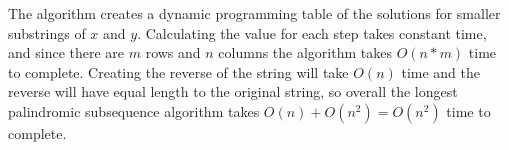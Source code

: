 \documentclass{article}
\begin{document}
The algorithm creates a dynamic programming table of the solutions for smaller substrings of $x$ and $y$. Calculating the value for each step takes constant time, and since there are $m$ rows and $n$ columns the algorithm takes $O(n*m)$ time to complete. Creating the reverse of the string will take $O(n)$ time and the reverse will have equal length to the original string, so overall the longest palindromic subsequence algorithm takes $O(n) + O(n^2) = O(n^2)$ time to complete.

\end{document}
